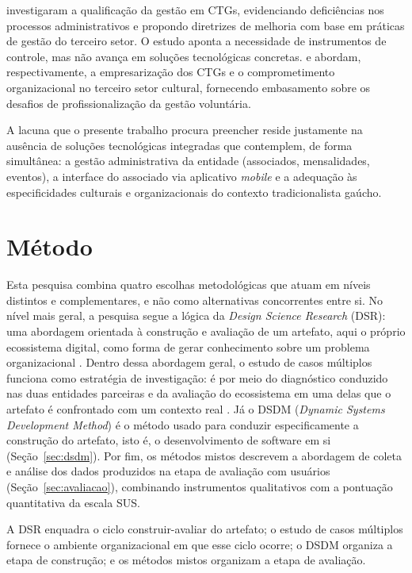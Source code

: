 \documentclass[12pt,a4paper]{article}
\begin{document}
\textcite{silvaalbarello2024} investigaram a qualificação da gestão em CTGs, evidenciando
deficiências nos processos administrativos e propondo diretrizes de melhoria com base em práticas de
gestão do terceiro setor. O estudo aponta a necessidade de instrumentos de controle, mas não avança
em soluções tecnológicas concretas. \textcite{vargas2019} e \textcite{fabricio2019} abordam,
respectivamente, a empresarização dos CTGs e o comprometimento organizacional no terceiro setor
cultural, fornecendo embasamento sobre os desafios de profissionalização da gestão voluntária.

A lacuna que o presente trabalho procura preencher reside justamente na ausência de soluções
tecnológicas integradas que contemplem, de forma simultânea: a gestão administrativa da entidade
(associados, mensalidades, eventos), a interface do associado via aplicativo \textit{mobile} e a
adequação às especificidades culturais e organizacionais do contexto tradicionalista gaúcho.

\section{Método}

Esta pesquisa combina quatro escolhas metodológicas que atuam em níveis distintos e complementares, e
não como alternativas concorrentes entre si. No nível mais geral, a pesquisa segue a lógica da
\textit{Design Science Research} (DSR): uma abordagem orientada à construção e avaliação de um
artefato, aqui o próprio ecossistema digital, como forma de gerar conhecimento sobre um problema
organizacional \parencite{hevner2004}. Dentro dessa abordagem geral, o estudo de casos múltiplos
funciona como estratégia de investigação: é por meio do diagnóstico conduzido nas duas entidades
parceiras e da avaliação do ecossistema em uma delas que o artefato é confrontado com um contexto
real \parencite{yin2015}. Já o DSDM (\textit{Dynamic Systems Development Method}) é o método usado para
conduzir especificamente a construção do artefato, isto é, o desenvolvimento de software em si
(Seção~\ref{sec:dsdm}). Por fim, os métodos mistos descrevem a abordagem de coleta e análise dos
dados produzidos na etapa de avaliação com usuários (Seção~\ref{sec:avaliacao}), combinando
instrumentos qualitativos com a pontuação quantitativa da escala SUS.

A DSR enquadra o ciclo
construir-avaliar do artefato; o estudo de casos múltiplos fornece o ambiente organizacional em que
esse ciclo ocorre; o DSDM organiza a etapa de construção; e os métodos mistos organizam a etapa de
avaliação.
\end{document}
